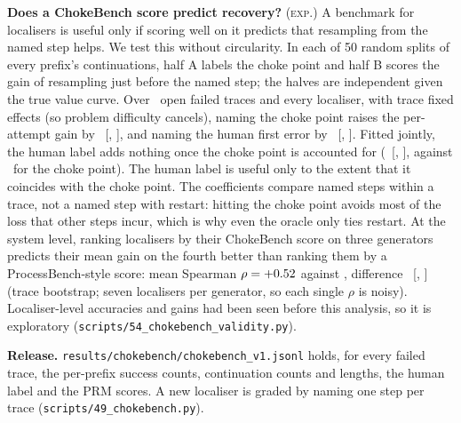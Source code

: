 \textbf{Does a ChokeBench score predict recovery?} (\textsc{exp}.) A benchmark for localisers is
useful only if scoring well on it predicts that resampling from the named step helps. We test this
without circularity. In each of 50 random splits of every prefix's continuations, half A labels the
choke point and half B scores the gain of resampling just before the named step; the halves are
independent given the true value curve. Over \valN\ open failed traces and every localiser, with
trace fixed effects (so problem difficulty cancels), naming the choke point raises the per-attempt
gain by \valD\ [\valDLo, \valDHi], and naming the human first error by \valE\ [\valELo, \valEHi].
Fitted jointly, the human label adds nothing once the choke point is accounted for (\valBothE\
[\valBothELo, \valBothEHi], against \valBothD\ for the choke point). The human label is useful only to the
extent that it coincides with the choke point. The coefficients compare named steps within a trace,
not a named step with restart: hitting the choke point avoids most of the loss that other steps
incur, which is why even the oracle only ties restart. At the system level, ranking localisers by
their ChokeBench score on three generators predicts their mean gain on the fourth better than
ranking them by a ProcessBench-style score: mean Spearman $\rho=+0.52$ against \valRhoE, difference
\valRhoDiff\ [\valRhoDiffLo, \valRhoDiffHi] (trace bootstrap; seven localisers per generator, so
each single $\rho$ is noisy). Localiser-level accuracies and gains had been seen before this analysis,
so it is exploratory (\texttt{scripts/54\_chokebench\_validity.py}).

\textbf{Release.} \texttt{results/chokebench/chokebench\_v1.jsonl} holds, for every failed trace,
the per-prefix success counts, continuation counts and lengths, the human label and the PRM scores.
A new localiser is graded by naming one step per trace (\texttt{scripts/49\_chokebench.py}).
